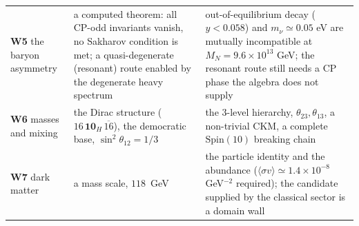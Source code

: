 \documentclass[aps,prd,amsmath,amssymb,superscriptaddress,longbibliography,floatfix,preprint]{revtex4-2}
\begin{document}
{\begin{longtable}{lll}
\arrayrulecolor{black!40}\hline\arrayrulecolor{black}
\parbox[c]{3.6cm}{\vspace{2.5pt}\raggedright {} \textbf{W5} the baryon asymmetry\vspace{2.5pt}} & \parbox[c]{5.21cm}{\vspace{2.5pt}\raggedright {} a computed theorem: all CP-odd invariants vanish, no Sakharov condition is met; a quasi-degenerate (resonant) route enabled by the degenerate heavy spectrum\vspace{2.5pt}} & \parbox[c]{6.29cm}{\vspace{2.5pt}\raggedright {} out-of-equilibrium decay (\mbox{$y < 0.058$}) and \mbox{$m_\nu \simeq 0.05$} eV are mutually incompatible at \mbox{$M_N = 9.6\times10^{13}$} GeV; the resonant route still needs a CP phase the algebra does not supply\vspace{2.5pt}} \\
\hline{}
\parbox[c]{3.6cm}{\vspace{2.5pt}\raggedright {} \textbf{W6} masses and mixing\vspace{2.5pt}} & \parbox[c]{5.21cm}{\vspace{2.5pt}\raggedright {} the Dirac structure (\mbox{$16\,\mathbf{10}_H\,\overline{16}$}), the democratic base, \mbox{$\sin^2\theta_{12} = 1/3$}\vspace{2.5pt}} & \parbox[c]{6.29cm}{\vspace{2.5pt}\raggedright {} the 3-level hierarchy, \mbox{$\theta_{23},\theta_{13}$}, a non-trivial CKM, a complete \mbox{$\mathrm{Spin}(10)$} breaking chain\vspace{2.5pt}} \\
\hline{}
\parbox[c]{3.6cm}{\vspace{2.5pt}\raggedright {} \textbf{W7} dark matter\vspace{2.5pt}} & \parbox[c]{5.21cm}{\vspace{2.5pt}\raggedright {} a mass scale, \mbox{$118$ GeV}\vspace{2.5pt}} & \parbox[c]{6.29cm}{\vspace{2.5pt}\raggedright {} the particle identity and the abundance (\mbox{$\langle\sigma v\rangle \simeq 1.4\times10^{-8}$} GeV\mbox{$^{-2}$} required); the candidate supplied by the classical sector is a domain wall\vspace{2.5pt}} \\

\end{longtable}}
\end{document}
